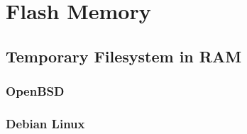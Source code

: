 \section{Flash Memory}

\subsection{Temporary Filesystem in RAM}

\subsubsection{OpenBSD}

\subsubsection{Debian Linux}